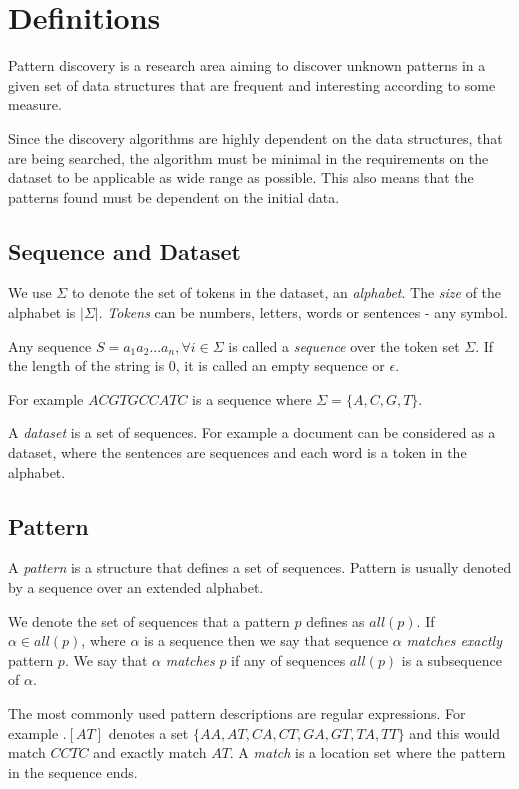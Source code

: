 \chapter{Definitions}

Pattern discovery is a research area aiming to discover unknown patterns
in a given set of data structures that are frequent and interesting according 
to some measure.

Since the discovery algorithms are highly dependent on the
data structures, that are being searched, the algorithm must be minimal
in the requirements on the dataset to be applicable as wide range as possible.
This also means that the patterns found must be dependent on the initial data.


\section{Sequence and Dataset}

We use $\Sigma$ to denote the set of tokens in the dataset, an \emph{alphabet}. 
The \emph{size} of the alphabet is $|\Sigma|$. \emph{Tokens} can be numbers, 
letters, words or sentences - any symbol.

Any sequence $S=a_1 a_2 ... a_n, \forall i \in \Sigma$ is called a \emph{sequence} 
over the token set $\Sigma$. If the length of the
string is $0$, it is called an empty sequence or $\epsilon$.

For example $ACGTGCCATC$ is a sequence where $\Sigma = \{A, C, G, T\}$.

A \emph{dataset} is a set of sequences. For example a document can be considered
as a dataset, where the sentences are sequences and each word is a token in the alphabet.

\section{Pattern}

A \emph{pattern} is a structure that defines a set of sequences. 
Pattern is usually denoted by a sequence over an extended alphabet.

We denote the set of sequences that a pattern $p$ defines as $all(p)$.
If $\alpha \in all(p)$, where $\alpha$ is a sequence then we say that
sequence $\alpha$ \emph{matches exactly} pattern $p$. We say that $\alpha$
\emph{matches} $p$ if any of sequences $all(p)$ is a subsequence of $\alpha$.

The most commonly used pattern descriptions are regular expressions.
For example $.[AT]$ denotes a set $\{AA, AT, CA, CT, GA, GT, TA, TT\}$ and
this would match $CCTC$ and exactly match $AT$. A \emph{match} is a location
set where the pattern in the sequence ends.

